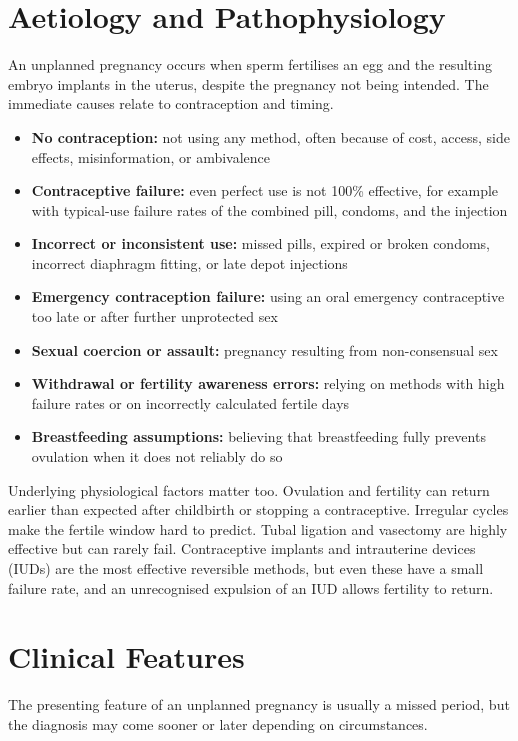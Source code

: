 \section*{Aetiology and Pathophysiology}
An unplanned pregnancy occurs when sperm fertilises an egg and the resulting embryo implants in the uterus, despite the pregnancy not being intended. The immediate causes relate to contraception and timing.

\begin{itemize}
    \item \textbf{No contraception:} not using any method, often because of cost, access, side effects, misinformation, or ambivalence
    \item \textbf{Contraceptive failure:} even perfect use is not 100\% effective, for example with typical-use failure rates of the combined pill, condoms, and the injection
    \item \textbf{Incorrect or inconsistent use:} missed pills, expired or broken condoms, incorrect diaphragm fitting, or late depot injections
    \item \textbf{Emergency contraception failure:} using an oral emergency contraceptive too late or after further unprotected sex
    \item \textbf{Sexual coercion or assault:} pregnancy resulting from non-consensual sex
    \item \textbf{Withdrawal or fertility awareness errors:} relying on methods with high failure rates or on incorrectly calculated fertile days
    \item \textbf{Breastfeeding assumptions:} believing that breastfeeding fully prevents ovulation when it does not reliably do so
\end{itemize}

Underlying physiological factors matter too. Ovulation and fertility can return earlier than expected after childbirth or stopping a contraceptive. Irregular cycles make the fertile window hard to predict. Tubal ligation and vasectomy are highly effective but can rarely fail. Contraceptive implants and intrauterine devices (IUDs) are the most effective reversible methods, but even these have a small failure rate, and an unrecognised expulsion of an IUD allows fertility to return.

\section*{Clinical Features}
The presenting feature of an unplanned pregnancy is usually a missed period, but the diagnosis may come sooner or later depending on circumstances.

